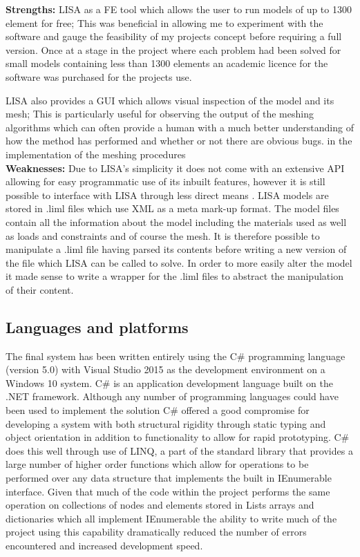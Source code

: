 \documentclass{article}
\begin{document}
\noindent
\textbf{Strengths: }LISA as a FE tool which allows the user to run models of up to 1300 element for free; This was beneficial in allowing me to experiment with the software and gauge the feasibility of my projects concept before requiring a full version. Once at a stage in the project where each problem had been solved for small models containing less than 1300 elements an academic licence for the software was purchased for the projects use.

LISA also provides a GUI which allows visual inspection of the model and its mesh; This is particularly useful for observing the output of the meshing algorithms which can often provide a human with a much better understanding of how the method has performed and whether or not there are obvious bugs. in the implementation of the meshing procedures \\ 

\noindent
\textbf{Weaknesses: } Due to LISA’s simplicity it does not come with an extensive API allowing for easy programmatic use of its inbuilt features, however it is still possible to interface with LISA through less direct means \cite{LISAManual}. LISA models are stored in .liml files which use XML as a meta mark-up format. The model files contain all the information about the model including the materials used as well as loads and constraints and of course the mesh. It is therefore possible to manipulate a .liml file having parsed its contents before writing a new version of the file which LISA can be called to solve. In order to more easily alter the model it made sense to write a wrapper  for the .liml files to abstract the manipulation of their content.

\subsection{Languages and platforms}
The final system has been written entirely using the C\# programming language (version 5.0) with Visual Studio 2015 as the development environment on a Windows 10 system. C\# is an application development language built on the .NET framework. Although any number of programming languages could have been used to implement the solution C\# offered a good compromise for developing a system with both structural rigidity through static typing and object orientation in addition to functionality to allow for rapid prototyping. C\# does this well through use of LINQ, a part of the standard library that provides a large number of higher order functions which allow for operations to be performed over any data structure that implements the built in IEnumerable interface. Given that much of the code within the project performs the same operation on collections of nodes and elements stored in Lists arrays and dictionaries which all implement IEnumerable the ability to write much of the project using this capability dramatically reduced the number of errors encountered and increased development speed.
\end{document}
